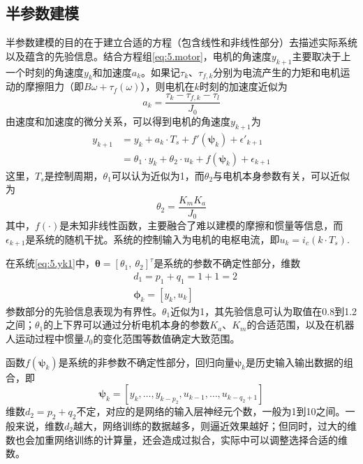 \subsection{半参数建模}\label{5.2.1}
半参数建模的目的在于建立合适的方程（包含线性和非线性部分）去描述实际系统以及蕴含的先验信息。结合方程组\eqref{eq:5.motor}，电机的角速度$y_{k+1}$主要取决于上一个时刻的角速度$y_{k}$和加速度$a_{k}$。如果记$\tau_{k}$、$\tau_{f,k}$分别为电流产生的力矩和电机运动的摩擦阻力（即$B \omega + \tau_{f}(\omega)$），则电机在$k$时刻的加速度近似为
$$a_{k}=\frac{\tau_{k}-\tau_{f,k}-\tau_{l}}{J_{0}}$$
由速度和加速度的微分关系，可以得到电机的角速度$y_{k+1}$为
\begin{equation}\label{eq:5.yk1}
\begin{split}
y_{k+1}&=y_{k}+a_{k}\cdot T_{s}+f'(\bm{\psi}_{k})+\epsilon'_{k+1}\\
&=\theta_{1}\cdot y_{k}+\theta_{2}\cdot u_{k}+f(\bm{\psi}_{k})+\epsilon_{k+1}
\end{split}
\end{equation}
这里，$T_{s}$是控制周期，$\theta_{1}$可以认为近似为1，而$\theta_{2}$与电机本身参数有关，可以近似为
$$\theta_{2}=\frac{K_{m}K_{a}}{J_{0}}$$
其中，$f(\cdot)$是未知非线性函数，主要融合了难以建模的摩擦和惯量等信息，而$\epsilon_{k+1}$是系统的随机干扰。系统的控制输入为电机的电枢电流，即$u_{k}=i_{c}(k\cdot T_{s})$.

在系统\eqref{eq:5.yk1}中，$\bm{\theta}=[\theta_{1},\ \theta_{2}]^{\tau}$是系统的参数不确定性部分，维数
\begin{equation}%
\begin{array}{cc}
&d_{1}=p_{1}+q_{1}=1+1=2\\
&\bm{\phi}_{k}=[y_{k},u_{k}]
\end{array}
\end{equation}
参数部分的先验信息表现为有界性。$\theta_{1}$近似为1，其先验信息可认为取值在0.8到1.2之间；$\theta_{1}$的上下界可以通过分析电机本身的参数$K_{a}$、$K_{m}$的合适范围，以及在机器人运动过程中惯量$J_{0}$的变化范围等数值确定大致范围。

函数$f(\bm{\psi}_{k})$是系统的非参数不确定性部分，回归向量$\bm{\psi}_{k}$是历史输入输出数据的组合，即
$$\bm{\psi}_{k}=[y_{k},\ldots,y_{k-p_{2}},u_{k-1},\dots,u_{k-q_{2}+1}]$$
维数$d_{2}=p_{2}+q_{2}$不定，对应的是网络的输入层神经元个数，一般为1到10之间。一般来说，维数$d_{2}$越大，网络训练的数据越多，则逼近效果越好；但同时，过大的维数也会加重网络训练的计算量，还会造成过拟合，实际中可以调整选择合适的维数。


